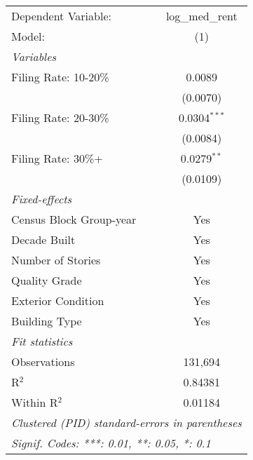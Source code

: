 \begingroup
\centering
\begin{tabular}{lc}
   \tabularnewline \midrule \midrule
   Dependent Variable:     & log\_med\_rent\\    
   Model:                  & (1)\\  
   \midrule
   \emph{Variables}\\
   Filing Rate: 10-20\%    & 0.0089\\   
                           & (0.0070)\\   
   Filing Rate: 20-30\%    & 0.0304$^{***}$\\   
                           & (0.0084)\\   
   Filing Rate: 30\%+      & 0.0279$^{**}$\\   
                           & (0.0109)\\   
   \midrule
   \emph{Fixed-effects}\\
   Census Block Group-year & Yes\\  
   Decade Built            & Yes\\  
   Number of Stories       & Yes\\  
   Quality Grade           & Yes\\  
   Exterior Condition      & Yes\\  
   Building Type           & Yes\\  
   \midrule
   \emph{Fit statistics}\\
   Observations            & 131,694\\  
   R$^2$                   & 0.84381\\  
   Within R$^2$            & 0.01184\\  
   \midrule \midrule
   \multicolumn{2}{l}{\emph{Clustered (PID) standard-errors in parentheses}}\\
   \multicolumn{2}{l}{\emph{Signif. Codes: ***: 0.01, **: 0.05, *: 0.1}}\\
\end{tabular}
\par\endgroup

